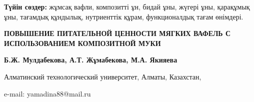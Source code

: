 {\bfseries Түйін сөздер:} жұмсақ вафли, композитті ұн, бидай ұны, жүгері
ұны, қарақұмық ұны, тағамдық құндылық, нутриенттік құрам, функционалдық
тағам өнімдері.

\begin{articleheader}
{\bfseries ПОВЫШЕНИЕ ПИТАТЕЛЬНОЙ ЦЕННОСТИ МЯГКИХ ВАФЕЛЬ С ИСПОЛЬЗОВАНИЕМ
КОМПОЗИТНОЙ МУКИ}

{\bfseries
Б.Ж. Мулдабекова,
А.Т. Жұмабекова,
М.А. Якияева\textsuperscript{\envelope }
}
\end{articleheader}

\begin{affiliation}
Алматинский технологический университет, Алматы, Казахстан,

e-mail: yamadina88@mail.ru
\end{affiliation}

